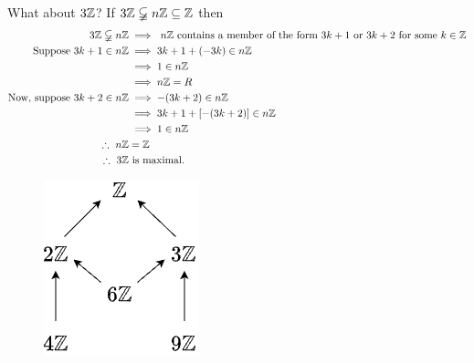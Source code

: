 \begin{example}
    What about $3{\mathbb{ Z}}$? If $3{\mathbb{ Z}} \varsubsetneqq n{\mathbb{ Z}} \subseteq {\mathbb{ Z}}$ then
    \begin{align}
        3{\mathbb{ Z}} \varsubsetneqq n{\mathbb{ Z}} &\implies \ n{\mathbb{ Z}} \text{ contains a member of the form }3k+1 \text{ or } 3k+2 \text{ for some }k\in {\mathbb{ Z}} \nonumber \\
        \text{Suppose }3k+1 \in n{\mathbb{ Z}} &\implies 3k+1 + (-3k) \in n{\mathbb{ Z}}  \nonumber \\
        &\implies 1 \in n{\mathbb{ Z}} \nonumber \\
        &\implies n{\mathbb{ Z}} = R \nonumber \\
        \text{Now, suppose }3k+2 \in n{\mathbb{ Z}} &\implies -(3k+2)\in n{\mathbb{ Z}} \nonumber \\
        &\implies 3k+1+[-(3k+2)]\in n{\mathbb{ Z}} \nonumber \\
        &\implies 1 \in n{\mathbb{ Z}} \nonumber \\
        \therefore \ n{\mathbb{ Z}} &= {\mathbb{ Z}} \nonumber \\
        \therefore \ 3{\mathbb{ Z}} &\text{ is maximal. } \nonumber
    \end{align}
    \begin{figure}[h!]
        \centering
        \includegraphics[width=0.3\linewidth]{Figures/Maximal_Ideals_Factor_Graph_thing.png}
    \end{figure}
\end{example}

